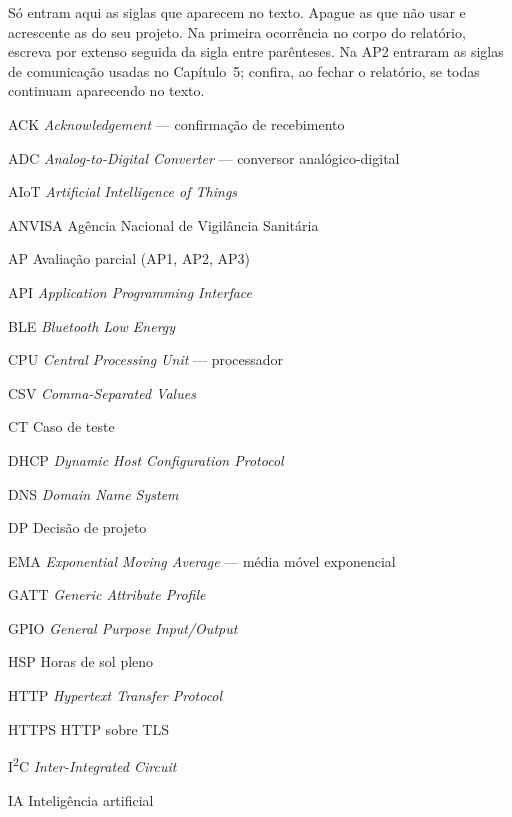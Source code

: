 \begin{orientacao}
Só entram aqui as siglas que aparecem no texto. Apague as que não usar e
acrescente as do seu projeto. Na primeira ocorrência no corpo do
relatório, escreva por extenso seguida da sigla entre parênteses.
Na AP2 entraram as siglas de comunicação usadas no Capítulo~5; confira,
ao fechar o relatório, se todas continuam aparecendo no texto.
\end{orientacao}

\begin{siglas}
  \item[ACK] \emph{Acknowledgement} --- confirmação de recebimento
  \item[ADC] \emph{Analog-to-Digital Converter} --- conversor analógico-digital
  \item[AIoT] \emph{Artificial Intelligence of Things}
  \item[ANVISA] Agência Nacional de Vigilância Sanitária
  \item[AP] Avaliação parcial (AP1, AP2, AP3)
  \item[API] \emph{Application Programming Interface}
  \item[BLE] \emph{Bluetooth Low Energy}
  \item[CPU] \emph{Central Processing Unit} --- processador
  \item[CSV] \emph{Comma-Separated Values}
  \item[CT] Caso de teste
  \item[DHCP] \emph{Dynamic Host Configuration Protocol}
  \item[DNS] \emph{Domain Name System}
  \item[DP] Decisão de projeto
  \item[EMA] \emph{Exponential Moving Average} --- média móvel exponencial
  \item[GATT] \emph{Generic Attribute Profile}
  \item[GPIO] \emph{General Purpose Input/Output}
  \item[HSP] Horas de sol pleno
  \item[HTTP] \emph{Hypertext Transfer Protocol}
  \item[HTTPS] HTTP sobre TLS
  \item[I\textsuperscript{2}C] \emph{Inter-Integrated Circuit}
  \item[IA] Inteligência artificial

\end{siglas}
